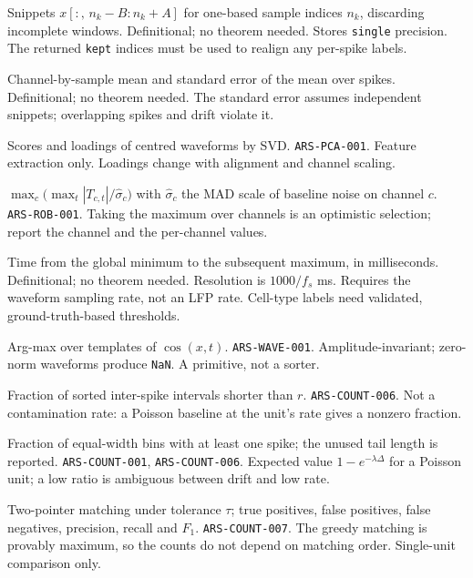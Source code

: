 {Snippets $x[:,\,n_k-B:n_k+A]$ for one-based sample indices $n_k$, discarding incomplete windows.}
{Definitional; no theorem needed.}
{Stores \texttt{single} precision. The returned \texttt{kept} indices must be used to realign any per-spike labels.}

{Channel-by-sample mean and standard error of the mean over spikes.}
{Definitional; no theorem needed.}
{The standard error assumes independent snippets; overlapping spikes and drift violate it.}

{Scores and loadings of centred waveforms by SVD.}
{\texttt{ARS-PCA-001}.}
{Feature extraction only. Loadings change with alignment and channel scaling.}

{$\max_c\bigl(\max_t|T_{c,t}|/\hat\sigma_c\bigr)$ with $\hat\sigma_c$ the MAD scale of baseline noise on channel $c$.}
{\texttt{ARS-ROB-001}.}
{Taking the maximum over channels is an optimistic selection; report the channel and the per-channel values.}

{Time from the global minimum to the subsequent maximum, in milliseconds.}
{Definitional; no theorem needed.}
{Resolution is $1000/f_s$ ms. Requires the waveform sampling rate, not an LFP rate. Cell-type labels need validated, ground-truth-based thresholds.}

{Arg-max over templates of $\cos(x,t)$.}
{\texttt{ARS-WAVE-001}.}
{Amplitude-invariant; zero-norm waveforms produce \texttt{NaN}. A primitive, not a sorter.}

{Fraction of sorted inter-spike intervals shorter than $r$.}
{\texttt{ARS-COUNT-006}.}
{Not a contamination rate: a Poisson baseline at the unit's rate gives a nonzero fraction.}

{Fraction of equal-width bins with at least one spike; the unused tail length is reported.}
{\texttt{ARS-COUNT-001}, \texttt{ARS-COUNT-006}.}
{Expected value $1-e^{-\lambda\Delta}$ for a Poisson unit; a low ratio is ambiguous between drift and low rate.}

{Two-pointer matching under tolerance $\tau$; true positives, false positives, false negatives, precision, recall and $F_1$.}
{\texttt{ARS-COUNT-007}.}
{The greedy matching is provably maximum, so the counts do not depend on matching order. Single-unit comparison only.}

